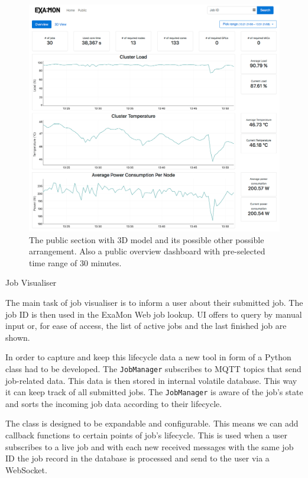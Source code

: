 \documentclass[a4paper, twoside]{article}
\newcommand{\highlight}[1]{\textcolor{prace-orange}{#1}}
\newcommand{\itempar}[1]{\noindent\highlight{\textsf #1}\par\noindent}
\begin{document}
\begin{multicols}{3}
\begin{figure}[t!]
\begin{minipage}[b]{\columnwidth}
        \includegraphics[width=\linewidth]{public-overview}
    \end{minipage}
    \caption*{The public section with 3D model and its possible other possible arrangement. Also a public overview dashboard with pre-selected time range of 30 minutes.}
    \label{fig:3d}
\end{figure}

\itempar{Job Visualiser}
The main task of job visualiser is to inform a user about their submitted job. The job ID is then used in the ExaMon Web job lookup. UI offers to query by manual input or, for ease of access, the list of active jobs and the last finished job are shown.

In order to capture and keep this lifecycle data a new tool in form of a Python class had to be developed. The \texttt{JobManager} subscribes to MQTT topics that send job-related data. This data is then stored in internal volatile database. This way it can keep track of all submitted jobs. The \texttt{JobManager} is aware of the job's state and sorts the incoming job data according to their lifecycle.

The class is designed to be expandable and configurable. This means we can add callback functions to certain points of job's lifecycle. This is used when a user subscribes to a live job and with each new received messages with the same job ID the job record in the database is processed and send to the user via a WebSocket.


\end{multicols}
\end{document}
